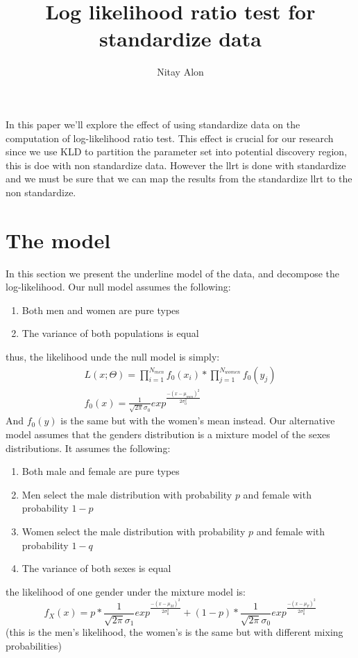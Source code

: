 \documentclass[12pt]{article}
\title{Log likelihood ratio test for standardize data}
\author{Nitay Alon}
\begin{document}
\maketitle
In this paper we'll explore the effect of using standardize data on the computation of log-likelihood ratio test. This effect is crucial for our research since we use KLD to partition the parameter set into potential discovery region, this is doe with non standardize data. However the llrt is done with standardize and we must be sure that we can map the results from the standardize llrt to the non standardize.  

\section{The model}
In this section we present the underline model of the data, and decompose the log-likelihood.
Our null model assumes the following:
	\begin{enumerate}
		\item Both men and women are pure types
		\item The variance of both populations is equal
	\end{enumerate}
thus, the likelihood unde the null model is simply:
\begin{gather}
L(x;\Theta) = \prod_{i=1}^{N_{men}}f_0(x_i) * \prod_{j=1}^{N_{women}}f_0(y_j) \\
f_0(x) = \frac{1}{\sqrt{2\pi}\sigma_0}exp^{\frac{-(x - \mu_{men})^2}{2\sigma_0^2}}
\end{gather}
And $f_0(y)$ is the same but with the women's mean instead.
Our alternative model assumes that the genders distribution is a mixture model of the sexes distributions. It assumes the following:
	\begin{enumerate}
		\item Both male and female are pure types
		\item Men select the male distribution with probability $p$ and female with probability $1-p$
		\item Women select the male distribution with probability $p$ and female with probability $1-q$
		\item The variance of both sexes is equal
	\end{enumerate}
the likelihood of one gender under the mixture model is:
\begin{equation}
f_X(x) = p*\frac{1}{\sqrt{2\pi}\sigma_1}exp^{\frac{-(x - \mu_{M})^2}{2\sigma_0^2}} + (1-p)*\frac{1}{\sqrt{2\pi}\sigma_0}exp^{\frac{-(x - \mu_{F})^2}{2\sigma_0^2}}
\end{equation}
(this is the men's likelihood, the women's is the same but with different mixing probabilities)
\end{document}
